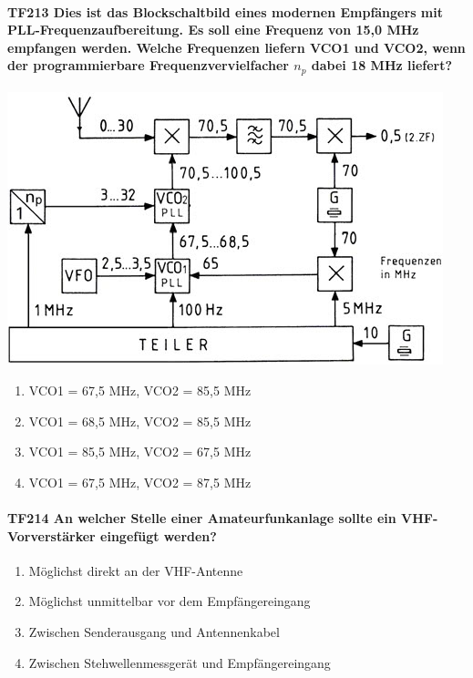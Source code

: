 \documentclass[8pt]{article}
\begin{document}
\paragraph*{TF213 Dies ist das Blockschaltbild eines modernen Empfängers mit PLL-Frequenzaufbereitung. Es soll eine Frequenz von 15,0 MHz empfangen werden. Welche Frequenzen liefern VCO1 und VCO2, wenn der programmierbare Frequenzvervielfacher $n_{p}$ dabei 18 MHz liefert?}
\begin{center}
	\begin{minipage}{\linewidth}
		\centering
		\includegraphics[scale=1.0]{pics/tf213_a.jpg}
	\end{minipage}
\end{center}
\begin{enumerate}[nolistsep,label=\Alph*]
\item VCO1 = 67,5 MHz, VCO2 = 85,5 MHz
\item VCO1 = 68,5 MHz, VCO2 = 85,5 MHz
\item VCO1 = 85,5 MHz, VCO2 = 67,5 MHz
\item VCO1 = 67,5 MHz, VCO2 = 87,5 MHz
\end{enumerate}

\paragraph*{TF214 An welcher Stelle einer Amateurfunkanlage sollte ein VHF-Vorverstärker eingefügt werden?}
\begin{enumerate}[nolistsep,label=\Alph*]
\item Möglichst direkt an der VHF-Antenne
\item Möglichst unmittelbar vor dem Empfängereingang
\item Zwischen Senderausgang und Antennenkabel
\item Zwischen Stehwellenmessgerät und Empfängereingang
\end{enumerate}
\end{document}
